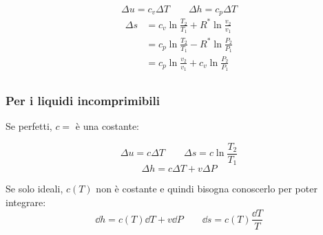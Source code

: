 \[ \Delta u = c_v \Delta T \qquad \Delta h = c_p \Delta T \]
\begin{align*}
    \Delta s &= c_v \ln{\frac{T_2}{T_1}} + R^*\ln{\frac{v_2}{v_1}} \\
    &= c_p \ln{\frac{T_2}{T_1}} - R^*\ln{\frac{P_2}{P_1}} \\
    &= c_p \ln{\frac{v_2}{v_1}} + c_v\ln{\frac{P_2}{P_1}} \\
\end{align*}

\subsubsection{Per i liquidi incomprimibili}

Se perfetti, $c =$ è una costante:

\[ \Delta u = c \Delta T \qquad \Delta s = c \ln{\frac{T_2}{T_1}} \]
\[ \Delta h = c\Delta T + v \Delta P \]

Se solo ideali, $c(T)$ non è costante e quindi bisogna conoscerlo per poter integrare:
\[ \dd{h} = c(T)\dd{T} + v\dd{P} \qquad \dd{s} = c(T)\frac{\dd{T}}{T} \]
